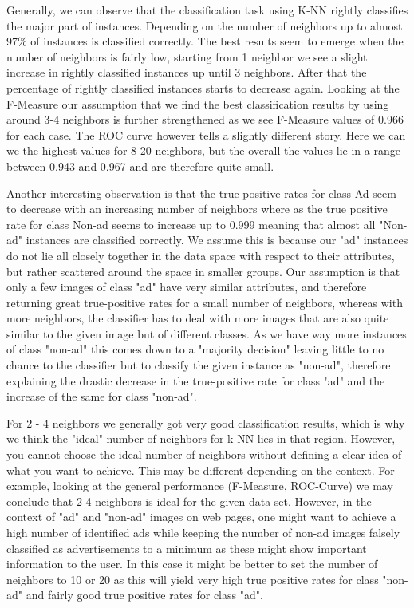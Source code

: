 \documentclass{article}
\begin{document}
Generally, we can observe that the classification task using K-NN rightly classifies the major part of instances. Depending on the number of neighbors up to almost 97\% of instances is classified correctly. The best results seem to emerge when the number of neighbors is fairly low, starting from 1 neighbor we see a slight increase in rightly classified instances up until 3 neighbors. After that the percentage of rightly classified instances starts to decrease again. Looking at the F-Measure our assumption that we find the best classification results by using around 3-4 neighbors is further strengthened as we see F-Measure values of 0.966 for each case. The ROC curve however tells a slightly different story. Here we can we the highest values for 8-20 neighbors, but the overall the values lie in a range between 0.943 and 0.967 and are therefore quite small.

Another interesting observation is that the true positive rates for class Ad seem to decrease with an increasing number of neighbors where as the true positive rate for class Non-ad seems to increase up to 0.999 meaning that almost all "Non-ad" instances are classified correctly. We assume this is because our "ad" instances do not lie all closely together in the data space with respect to their attributes, but rather scattered around the space in smaller groups. Our assumption is that only a few images of class "ad" have very similar attributes, and therefore returning great true-positive rates for a small number of neighbors, whereas with more neighbors, the classifier has to deal with more images that are also quite similar to the given image but of different classes. As we have way more instances of class "non-ad" this comes down to a "majority decision" leaving little to no chance to the classifier but to classify the given instance as "non-ad", therefore explaining the drastic decrease in the true-positive rate for class "ad" and the increase of the same for class "non-ad".

For 2 - 4 neighbors we generally got very good classification results, which is why we think the "ideal" number of neighbors for k-NN lies in that region. However, you cannot choose the ideal number of neighbors without defining a clear idea of what you want to achieve. This may be different depending on the context. For example, looking at the general performance (F-Measure, ROC-Curve) we may conclude that 2-4 neighbors is ideal for the given data set. However, in the context of "ad" and "non-ad" images on web pages, one might want to achieve a high number of identified ads while keeping the number of non-ad images falsely classified  as advertisements to a minimum as these might show important information to the user. In this case it might be better to set the number of neighbors to 10 or 20 as this will yield very high true positive rates for class "non-ad" and fairly good true positive rates for class "ad". 
\end{document}
